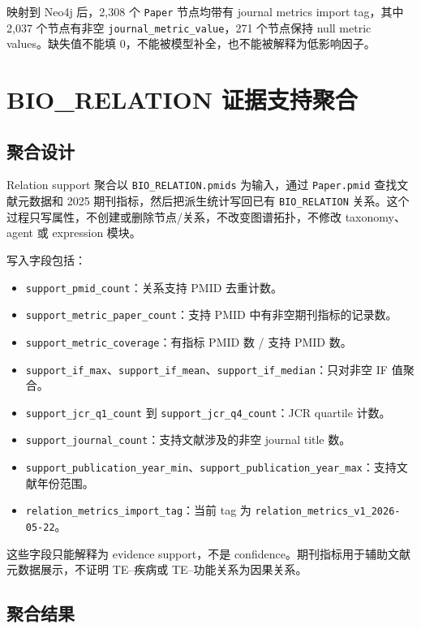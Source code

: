 \documentclass[12pt,a4paper,UTF8]{ctexart}
\newcommand{\code}[1]{\texttt{#1}}
\begin{document}
映射到 Neo4j 后，2,308 个 \code{Paper} 节点均带有 journal metrics import tag，其中 2,037 个节点有非空 \code{journal\_metric\_value}，271 个节点保持 null metric values。缺失值不能填 0，不能被模型补全，也不能被解释为低影响因子。

\section{BIO\_RELATION 证据支持聚合}

\subsection{聚合设计}

Relation support 聚合以 \code{BIO\_RELATION.pmids} 为输入，通过 \code{Paper.pmid} 查找文献元数据和 2025 期刊指标，然后把派生统计写回已有 \code{BIO\_RELATION} 关系。这个过程只写属性，不创建或删除节点/关系，不改变图谱拓扑，不修改 taxonomy、agent 或 expression 模块。

写入字段包括：

\begin{itemize}
  \item \code{support\_pmid\_count}：关系支持 PMID 去重计数。
  \item \code{support\_metric\_paper\_count}：支持 PMID 中有非空期刊指标的记录数。
  \item \code{support\_metric\_coverage}：有指标 PMID 数 / 支持 PMID 数。
  \item \code{support\_if\_max}、\code{support\_if\_mean}、\code{support\_if\_median}：只对非空 IF 值聚合。
  \item \code{support\_jcr\_q1\_count} 到 \code{support\_jcr\_q4\_count}：JCR quartile 计数。
  \item \code{support\_journal\_count}：支持文献涉及的非空 journal title 数。
  \item \code{support\_publication\_year\_min}、\code{support\_publication\_year\_max}：支持文献年份范围。
  \item \code{relation\_metrics\_import\_tag}：当前 tag 为 \code{relation\_metrics\_v1\_2026-05-22}。
\end{itemize}

这些字段只能解释为 evidence support，不是 confidence。期刊指标用于辅助文献元数据展示，不证明 TE--疾病或 TE--功能关系为因果关系。

\subsection{聚合结果}
\end{document}
